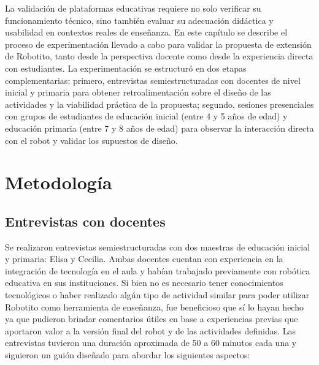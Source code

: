 \documentclass{prgrado}
\begin{document}
La validación de plataformas educativas requiere no solo verificar su funcionamiento técnico, sino también evaluar su adecuación didáctica y usabilidad en contextos reales de enseñanza. En este capítulo se describe el proceso de experimentación llevado a cabo para validar la propuesta de extensión de Robotito, tanto desde la perspectiva docente como desde la experiencia directa con estudiantes.
La experimentación se estructuró en dos etapas complementarias: primero, entrevistas semiestructuradas con docentes de nivel inicial y primaria para obtener retroalimentación sobre el diseño de las actividades y la viabilidad práctica de la propuesta; segundo, sesiones presenciales con grupos de estudiantes de educación inicial (entre 4 y 5 años de edad) y educación primaria (entre 7 y 8 años de edad) para observar la interacción directa con el robot y validar los supuestos de diseño.

\section{Metodología}

\subsection{Entrevistas con docentes}

Se realizaron entrevistas semiestructuradas con dos maestras de educación inicial y primaria: Elisa y Cecilia. Ambas docentes cuentan con experiencia en la integración de tecnología en el aula y habían trabajado previamente con robótica educativa en sus instituciones. Si bien no es necesario tener conocimientos tecnológicos o haber realizado algún tipo de actividad similar para poder utilizar Robotito como herramienta de enseñanza, fue beneficioso que sí lo hayan hecho ya que pudieron brindar comentarios útiles en base a experiencias previas que aportaron valor a la versión final del robot y de las actividades definidas.
Las entrevistas tuvieron una duración aproximada de 50 a 60 minutos cada una y siguieron un guión diseñado para abordar los siguientes aspectos:
\end{document}
